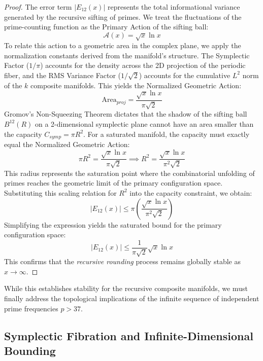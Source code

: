 \documentclass[sn-mathphys-num, pdflatex]{sn-jnl}
\begin{document}
\begin{proof}
The error term $|E_{12}(x)|$ represents the total informational variance generated by the recursive sifting of primes. We treat the fluctuations of the prime-counting function as the Primary Action of the sifting ball:
\begin{equation}
\mathcal{A}(x) = \sqrt{x} \ln x
\end{equation}
To relate this action to a geometric area in the complex plane, we apply the normalization constants derived from the manifold’s structure. The Symplectic Factor ($1/\pi$) accounts for the density across the 2D projection of the periodic fiber, and the RMS Variance Factor ($1/\sqrt{2}$) accounts for the cumulative $L^2$ norm of the $k$ composite manifolds. This yields the Normalized Geometric Action:
\begin{equation}
\text{Area}_{proj} = \frac{\sqrt{x} \ln x}{\pi \sqrt{2}}
\end{equation}
Gromov’s Non-Squeezing Theorem dictates that the shadow of the sifting ball $B^{12}(R)$ on a 2-dimensional symplectic plane cannot have an area smaller than the capacity $C_{symp} = \pi R^2$. For a saturated manifold, the capacity must exactly equal the Normalized Geometric Action:
\begin{equation}
\pi R^2 = \frac{\sqrt{x} \ln x}{\pi \sqrt{2}} \implies R^2 = \frac{\sqrt{x} \ln x}{\pi^2 \sqrt{2}}
\end{equation}
This radius represents the saturation point where the combinatorial unfolding of primes reaches the geometric limit of the primary configuration space. Substituting this scaling relation for $R^2$ into the capacity constraint, we obtain:
\begin{equation}
|E_{12}(x)| \le \pi \left( \frac{\sqrt{x} \ln x}{\pi^2 \sqrt{2}} \right)
\end{equation}
Simplifying the expression yields the saturated bound for the primary configuration space:
\begin{equation}
|E_{12}(x)| \le \frac{1}{\pi\sqrt{2}} \sqrt{x} \ln x
\end{equation}
This confirms that the \textit{recursive rounding} process remains globally stable as $x \to \infty$.
\end{proof}

While this establishes stability for the recursive composite manifolds, we must finally address the topological implications of the infinite sequence of independent prime frequencies $p > 37$.

\subsection{Symplectic Fibration and Infinite-Dimensional Bounding}
\label{sec:fibration}
\end{document}
